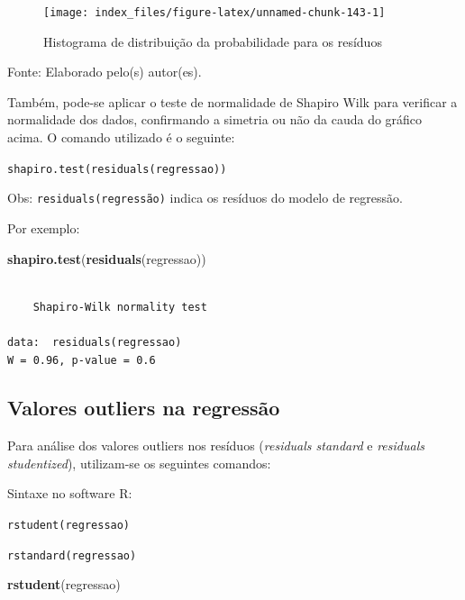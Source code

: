 \documentclass[12pt,brazil,oneside]{book}
\newenvironment{Shaded}{\begin{snugshade}}{\end{snugshade}}
\newcommand{\KeywordTok}[1]{\textcolor[rgb]{0.13,0.29,0.53}{\textbf{#1}}}
\newcommand{\NormalTok}[1]{#1}
\begin{document}
\begin{figure}[H]

{\centering \texttt{[image: index\_files/figure-latex/unnamed-chunk-143-1]} 

}

\caption{Histograma de distribuição da probabilidade para os resíduos}\label{fig:unnamed-chunk-143}
\end{figure}

Fonte: Elaborado pelo(s) autor(es).

Também, pode-se aplicar o teste de normalidade de Shapiro Wilk para verificar a normalidade dos dados, confirmando a simetria ou não da cauda do gráfico acima. O comando utilizado é o seguinte:

\texttt{shapiro.test(residuals(regressao))}

Obs: \texttt{residuals(regressão)} indica os resíduos do modelo de regressão.

Por exemplo:

\begin{Shaded}
\begin{Highlighting}[]
\KeywordTok{shapiro.test}\NormalTok{(}\KeywordTok{residuals}\NormalTok{(regressao))}
\end{Highlighting}
\end{Shaded}

\begin{verbatim}

    Shapiro-Wilk normality test

data:  residuals(regressao)
W = 0.96, p-value = 0.6
\end{verbatim}

\hypertarget{valores-outliers-na-regressao}{%
\subsection{Valores outliers na regressão}\label{valores-outliers-na-regressao}}

Para análise dos valores outliers nos resíduos (\emph{residuals standard} e \emph{residuals studentized}), utilizam-se os seguintes comandos:

Sintaxe no software R:

\texttt{rstudent(regressao)}

\texttt{rstandard(regressao)}

\begin{Shaded}
\begin{Highlighting}[]
\KeywordTok{rstudent}\NormalTok{(regressao)}
\end{Highlighting}
\end{Shaded}
\end{document}
